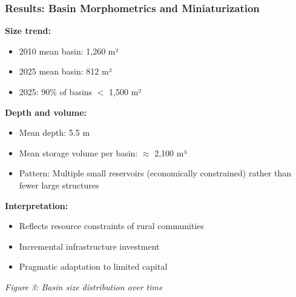 \documentclass{beamer}
\begin{document}
\begin{frame}
\frametitle{Results: Basin Morphometrics and Miniaturization}

\textbf{Size trend:}
\begin{itemize}
  \item 2010 mean basin: 1,260 m²
  \item 2025 mean basin: 812 m²
  \item 2025: 90\% of basins $<$ 1,500 m²
\end{itemize}

\textbf{Depth and volume:}
\begin{itemize}
  \item Mean depth: 5.5 m
  \item Mean storage volume per basin: $\approx$ 2,100 m³
  \item Pattern: Multiple small reservoirs (economically constrained) rather than fewer large structures
\end{itemize}

\textbf{Interpretation:}
\begin{itemize}
  \item Reflects resource constraints of rural communities
  \item Incremental infrastructure investment
  \item Pragmatic adaptation to limited capital
\end{itemize}

\begin{center}
  \small{\textit{Figure 3: Basin size distribution over time}}
\end{center}
\end{frame}
\end{document}
